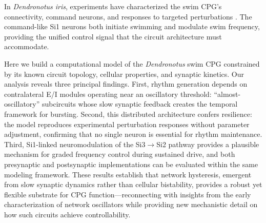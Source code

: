 In \textit{Dendronotus iris}, experiments have characterized the swim CPG's connectivity, command neurons, and responses to targeted perturbations \cite{SakuraiKatz2016, sakurai2019command}.
The command-like Si1 neurons both initiate swimming and modulate swim frequency, providing the unified control signal that the circuit architecture must accommodate.

Here we build a computational model of the \textit{Dendronotus} swim CPG constrained by its known circuit topology, cellular properties, and synaptic kinetics.
Our analysis reveals three principal findings.
First, rhythm generation depends on contralateral E/I modules operating near an oscillatory threshold: ``almost-oscillatory'' subcircuits whose slow synaptic feedback creates the temporal framework for bursting.
Second, this distributed architecture confers resilience: the model reproduces experimental perturbation responses without parameter adjustment, confirming that no single neuron is essential for rhythm maintenance.
Third, Si1-linked neuromodulation of the Si3$\to$Si2 pathway provides a plausible mechanism for graded frequency control during sustained drive, and both presynaptic and postsynaptic implementations can be evaluated within the same modeling framework.
These results establish that network hysteresis, emergent from slow synaptic dynamics rather than cellular bistability, provides a robust yet flexible substrate for CPG function---reconnecting with insights from the early characterization of network oscillators while providing new mechanistic detail on how such circuits achieve controllability.
